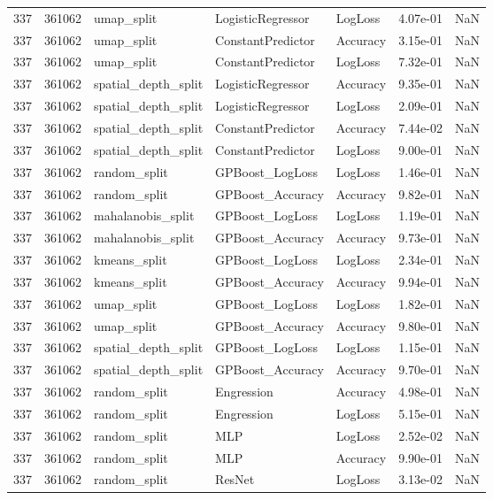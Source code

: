 \begin{tabular}{rrlllrr}
337 & 361062 & umap\_split & LogisticRegressor & LogLoss & 4.07e-01 & NaN \\
337 & 361062 & umap\_split & ConstantPredictor & Accuracy & 3.15e-01 & NaN \\
337 & 361062 & umap\_split & ConstantPredictor & LogLoss & 7.32e-01 & NaN \\
337 & 361062 & spatial\_depth\_split & LogisticRegressor & Accuracy & 9.35e-01 & NaN \\
337 & 361062 & spatial\_depth\_split & LogisticRegressor & LogLoss & 2.09e-01 & NaN \\
337 & 361062 & spatial\_depth\_split & ConstantPredictor & Accuracy & 7.44e-02 & NaN \\
337 & 361062 & spatial\_depth\_split & ConstantPredictor & LogLoss & 9.00e-01 & NaN \\
337 & 361062 & random\_split & GPBoost\_LogLoss & LogLoss & 1.46e-01 & NaN \\
337 & 361062 & random\_split & GPBoost\_Accuracy & Accuracy & 9.82e-01 & NaN \\
337 & 361062 & mahalanobis\_split & GPBoost\_LogLoss & LogLoss & 1.19e-01 & NaN \\
337 & 361062 & mahalanobis\_split & GPBoost\_Accuracy & Accuracy & 9.73e-01 & NaN \\
337 & 361062 & kmeans\_split & GPBoost\_LogLoss & LogLoss & 2.34e-01 & NaN \\
337 & 361062 & kmeans\_split & GPBoost\_Accuracy & Accuracy & 9.94e-01 & NaN \\
337 & 361062 & umap\_split & GPBoost\_LogLoss & LogLoss & 1.82e-01 & NaN \\
337 & 361062 & umap\_split & GPBoost\_Accuracy & Accuracy & 9.80e-01 & NaN \\
337 & 361062 & spatial\_depth\_split & GPBoost\_LogLoss & LogLoss & 1.15e-01 & NaN \\
337 & 361062 & spatial\_depth\_split & GPBoost\_Accuracy & Accuracy & 9.70e-01 & NaN \\
337 & 361062 & random\_split & Engression & Accuracy & 4.98e-01 & NaN \\
337 & 361062 & random\_split & Engression & LogLoss & 5.15e-01 & NaN \\
337 & 361062 & random\_split & MLP & LogLoss & 2.52e-02 & NaN \\
337 & 361062 & random\_split & MLP & Accuracy & 9.90e-01 & NaN \\
337 & 361062 & random\_split & ResNet & LogLoss & 3.13e-02 & NaN \\

\end{tabular}
